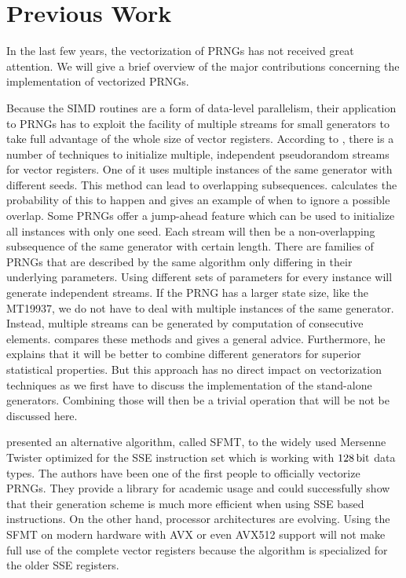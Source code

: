 \documentclass{stdlocal}
\begin{document}
\section{Previous Work} %
\label{sec:previous_work}
  In the last few years, the vectorization of PRNGs has not received great attention.
  We will give a brief overview of the major contributions concerning the implementation of vectorized PRNGs.

  Because the SIMD routines are a form of data-level parallelism, their application to PRNGs has to exploit the facility of multiple streams for small generators to take full advantage of the whole size of vector registers.
  According to \textcite{fog2015}, there is a number of techniques to initialize multiple, independent pseudorandom streams for vector registers.
  One of it uses multiple instances of the same generator with different seeds.
  This method can lead to overlapping subsequences.
  \citeauthor{fog2015} calculates the probability of this to happen and gives an example of when to ignore a possible overlap.
  Some PRNGs offer a jump-ahead feature which can be used to initialize all instances with only one seed.
  Each stream will then be a non-overlapping subsequence of the same generator with certain length.
  There are families of PRNGs that are described by the same algorithm only differing in their underlying parameters.
  Using different sets of parameters for every instance will generate independent streams.
  If the PRNG has a larger state size, like the MT19937, we do not have to deal with multiple instances of the same generator.
  Instead, multiple streams can be generated by computation of consecutive elements.
  \citeauthor{fog2015} compares these methods and gives a general advice.
  Furthermore, he explains that it will be better to combine different generators for superior statistical properties.
  But this approach has no direct impact on vectorization techniques as we first have to discuss the implementation of the stand-alone generators.
  Combining those will then be a trivial operation that will be not be discussed here.

  \textcite{saito2008} presented an alternative algorithm, called SFMT, to the widely used Mersenne Twister optimized for the SSE instruction set which is working with $128\, \mathrm{bit}$ data types.
  The authors have been one of the first people to officially vectorize PRNGs.
  They provide a library for academic usage and could successfully show that their generation scheme is much more efficient when using SSE based instructions.
  On the other hand, processor architectures are evolving.
  Using the SFMT on modern hardware with AVX or even AVX512 support will not make full use of the complete vector registers because the algorithm is specialized for the older SSE registers.
\end{document}
